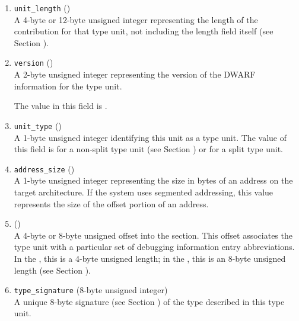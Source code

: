 \begin{enumerate}[1. ]
\item \texttt{unit\_length} () \\
A 4-byte or 12-byte unsigned integer 
representing the length
of the \dotdebuginfo{} contribution for that type unit,
not including the length field itself
\bb
(see Section ).
\eb

\item  \texttt{version} (\HFTuhalf) \\
A 2-byte unsigned integer representing the version of the
DWARF information for the type unit.
 
The value in this field is \versiondotdebuginfo.

\item \texttt{unit\_type} (\HFTubyte) \\
A 1-byte unsigned integer identifying this unit as a type unit.
The value of this field is \DWUTtype{} for a non-split type unit
(see Section )
or \DWUTsplittype{} for a split type unit.

\item \texttt{address\_size} (\HFTubyte) \\
A 1-byte unsigned integer representing the size 
in bytes of
an address on the target architecture. If the system uses
segmented addressing, this value represents the size of the
offset portion of an address.

\item \HFNdebugabbrevoffset{} () \\
A 
4-byte or 8-byte unsigned offset into the 
\dotdebugabbrev{}
section. This offset associates the type unit with a
particular set of debugging information entry abbreviations. In
the \thirtytwobitdwarfformat, this is a 4-byte unsigned length;
in the \sixtyfourbitdwarfformat, this is an 8-byte unsigned length
(see Section ).

\item \texttt{type\_signature} (8-byte unsigned integer) \\
A unique 8-byte signature (see Section 
)
of the type described in this type
unit.  


\end{enumerate}
